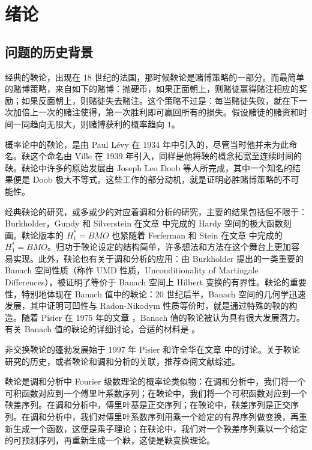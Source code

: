 \def\M{\mathcal{M}}
\def\T{\tau}
\def\E{\mathcal{E}}

\chapter{绪论}
\section{问题的历史背景}
经典的鞅论，出现在 18 世纪的法国，那时候鞅论是赌博策略的一部分。而最简单的赌博策略，来自如下的赌博：抛硬币，如果正面朝上，则赌徒赢得赌注相应的奖励；如果反面朝上，则赌徒失去赌注。这个策略不过是：每当赌徒失败，就在下一次加倍上一次的赌注使得，第一次胜利即可赢回所有的损失。假设赌徒的赌资和时间一同趋向无限大，则赌博获利的概率趋向 $1$。
 
\par 概率论中的鞅论，是由 Paul L\'{e}vy 在 1934 年中引入的，尽管当时他并未为此命名。鞅这个命名由 Ville 在 1939 年引入，同样是他将鞅的概念拓宽至连续时间的鞅。鞅论中许多的原始发展由 Joseph Leo Doob 等人所完成，其中一个知名的结果便是 Doob 极大不等式。这些工作的部分动机，就是证明必胜赌博策略的不可能性。

\par 经典鞅论的研究，或多或少的对应着调和分析的研究，主要的结果包括但不限于：Burkholder，Gundy 和 Silverstein 在文章 \cite{burkholder1971maximal} 中完成的 Hardy 空间的极大函数刻画。鞅论版本的 $H_1^\ast=BMO$ 也紧随着 Ferferman 和 Stein 在文章 \cite{fefferman1972h} 中完成的 $H_1^\ast=BMO$。归功于鞅论设定的结构简单，许多想法和方法在这个舞台上更加容易实现。此外，鞅论也有关于调和分析的应用：由 Burkholder 提出的一类重要的 Banach 空间性质（称作 UMD 性质，Unconditionality of Martingale Differences），被证明了等价于 Banach 空间上 Hilbert 变换的有界性\cite[Chapter~6]{pisier2016martingales}。鞅论的重要性，特别地体现在 Banach 值中的鞅论：20 世纪后半，Banach 空间的几何学迅速发展，其中证明可凹性与 Radon-Nikodym 性质等价时，就是通过特殊的鞅的构造\cite{刘培德2017鞅空间理论的新进展}。随着 Pisier 在 1975 年的文章 \cite{pisier1975martingales}，Banach 值的鞅论被认为具有很大发展潜力。有关 Banach 值的鞅论的详细讨论，合适的材料是 \cite{pisier2016martingales}。

\par 非交换鞅论的蓬勃发展始于 1997 年 Pisier 和许全华在文章\cite{PX1} 中的讨论。关于鞅论研究的历史，或者鞅论和调和分析的关联，推荐查阅文献综述\cite{刘培德2017鞅空间理论的新进展}。

\par 鞅论是调和分析中 Fourier 级数理论的概率论类似物：在调和分析中，我们将一个可积函数对应到一个傅里叶系数序列；在鞅论中，我们将一个可积函数对应到一个鞅差序列。在调和分析中，傅里叶基是正交序列；在鞅论中，鞅差序列是正交序列。在调和分析中，我们对傅里叶系数序列用乘一个给定的有界序列做变换，再重新生成一个函数，这便是乘子理论；在鞅论中，我们对一个鞅差序列乘以一个给定的可预测序列，再重新生成一个鞅，这便是鞅变换理论。

